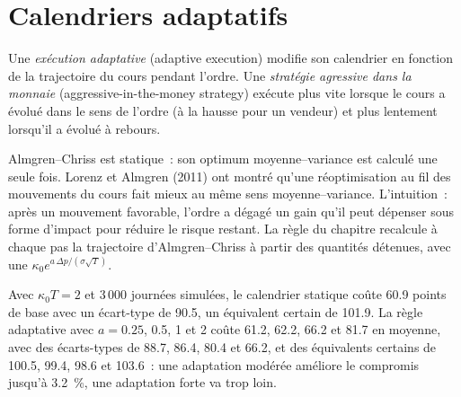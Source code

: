 \section{Calendriers adaptatifs}

\begin{definition}\label{def:mx:beyond-almgren-chriss:adaptive}
Une \emph{exécution adaptative} (adaptive execution) modifie son calendrier en fonction de la trajectoire du cours pendant l'ordre. Une \emph{stratégie agressive dans la
monnaie} (aggressive-in-the-money strategy) exécute plus vite lorsque le cours a évolué dans le sens de l'ordre (à la hausse pour un vendeur) et plus lentement lorsqu'il a
évolué à rebours.
\end{definition}

Almgren--Chriss est statique~: son optimum moyenne--variance est calculé une seule fois. Lorenz et Almgren (2011) ont montré qu'une réoptimisation au fil des mouvements du cours fait mieux
au même sens moyenne--variance. L'intuition~: après un mouvement favorable, l'ordre a dégagé un gain qu'il peut dépenser sous forme d'impact pour réduire le risque restant.
La règle du chapitre recalcule à chaque pas la trajectoire d'Almgren--Chriss à partir des quantités détenues, avec une  $\kappa_0e^{a\,\Delta p/(\sigma\sqrt T)}$.

\label{lst:mx:beyond-almgren-chriss:aim}

Avec $\kappa_0T=2$ et 3\,000 journées simulées, le calendrier statique coûte 60.9 points de base avec un écart-type de 90.5, un équivalent certain de 101.9. La
règle adaptative avec $a=0.25$, 0.5, 1 et 2 coûte 61.2, 62.2, 66.2 et 81.7 en moyenne, avec des écarts-types de 88.7, 86.4, 80.4 et 66.2, et des équivalents certains
de 100.5, 99.4, 98.6 et 103.6~: une adaptation modérée améliore le compromis jusqu'à 3.2~\%, une adaptation forte va trop loin.

